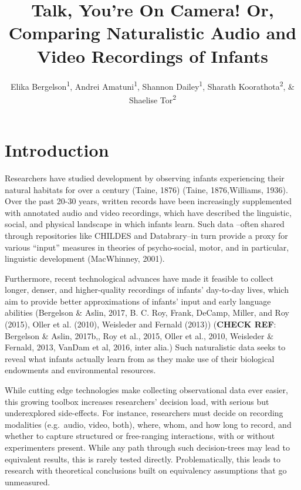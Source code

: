 \documentclass[man]{apa6}
\title{Talk, You're On Camera! Or, Comparing Naturalistic Audio and Video
Recordings of Infants}
\author{Elika Bergelson\textsuperscript{1}, Andrei Amatuni\textsuperscript{1}, Shannon Dailey\textsuperscript{1}, Sharath Koorathota\textsuperscript{2}, \& Shaelise Tor\textsuperscript{2}}
\affiliation{
    \vspace{0.5cm}
          \textsuperscript{1} Duke University\\
          \textsuperscript{2} University of Rochester  }
\theoremstyle{definition}
\theoremstyle{definition}
\theoremstyle{definition}
\theoremstyle{remark}
\begin{document}
\maketitle

\setcounter{secnumdepth}{0}



\section{Introduction}\label{introduction}

Researchers have studied development by observing infants experiencing
their natural habitats for over a century (Taine, 1876) (Taine,
1876,Williams, 1936). Over the past 20-30 years, written records have
been increasingly supplemented with annotated audio and video
recordings, which have described the linguistic, social, and physical
landscape in which infants learn. Such data --often shared through
repositories like CHILDES and Databrary--in turn provide a proxy for
various \enquote{input} measures in theories of psycho-social, motor,
and in particular, linguistic development (MacWhinney, 2001).

Furthermore, recent technological advances have made it feasible to
collect longer, denser, and higher-quality recordings of infants'
day-to-day lives, which aim to provide better approximations of infants'
input and early language abilities (Bergelson \& Aslin, 2017, B. C. Roy,
Frank, DeCamp, Miller, and Roy (2015), Oller et al. (2010), Weisleder
and Fernald (2013)) (\textbf{CHECK REF}: Bergelson \& Aslin, 2017b,, Roy
et al., 2015, Oller et al., 2010, Weisleder \& Fernald, 2013, VanDam et
al, 2016, inter alia.) Such naturalistic data seeks to reveal what
infants actually learn from as they make use of their biological
endowments and environmental resources.

While cutting edge technologies make collecting observational data ever
easier, this growing toolbox increases researchers' decision load, with
serious but underexplored side-effects. For instance, researchers must
decide on recording modalities (e.g.~audio, video, both), where, whom,
and how long to record, and whether to capture structured or
free-ranging interactions, with or without experimenters present. While
any path through such decision-trees may lead to equivalent results,
this is rarely tested directly. Problematically, this leads to research
with theoretical conclusions built on equivalency assumptions that go
unmeasured.
\end{document}
